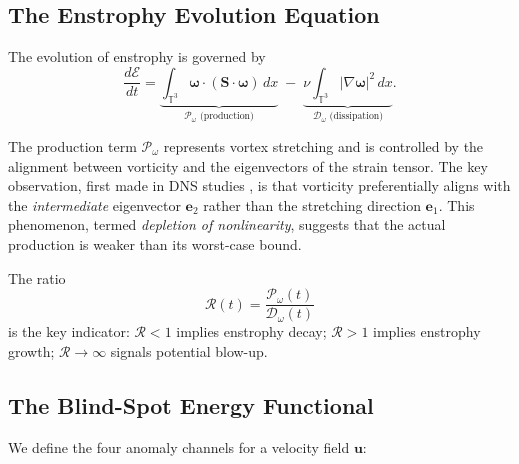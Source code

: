 \documentclass[12pt, a4paper]{article}
\newcommand{\T}{\mathbb{T}}
\newcommand{\dd}[2]{\frac{d #1}{d #2}}
\begin{document}
\subsection{The Enstrophy Evolution Equation}

The evolution of enstrophy is governed by
\begin{equation}\label{eq:enstrophy_evol}
\dd{\mathcal{E}}{t} = \underbrace{\int_{\T^3}
\boldsymbol{\omega} \cdot (\mathbf{S} \cdot \boldsymbol{\omega}) \, dx}_{\displaystyle\mathcal{P}_\omega \text{ (production)}}
\;-\; \underbrace{\nu \int_{\T^3}
|\nabla\boldsymbol{\omega}|^2 \, dx}_{\displaystyle\mathcal{D}_\omega \text{ (dissipation)}}.
\end{equation}

The production term $\mathcal{P}_\omega$ represents vortex stretching
and is controlled by the alignment between vorticity and the eigenvectors
of the strain tensor. The key observation, first made in DNS studies
\cite{ashurst1987,tsinober1992}, is that vorticity preferentially
aligns with the \emph{intermediate} eigenvector $\mathbf{e}_2$ rather
than the stretching direction $\mathbf{e}_1$. This phenomenon,
termed \emph{depletion of nonlinearity}, suggests that the actual
production is weaker than its worst-case bound.

The ratio
\begin{equation}\label{eq:PD_ratio}
\mathcal{R}(t) = \frac{\mathcal{P}_\omega(t)}{\mathcal{D}_\omega(t)}
\end{equation}
is the key indicator:
$\mathcal{R} < 1$ implies enstrophy decay;
$\mathcal{R} > 1$ implies enstrophy growth;
$\mathcal{R} \to \infty$ signals potential blow-up.

\subsection{The Blind-Spot Energy Functional}\label{subsec:Ebs}

We define the four anomaly channels for a velocity field $\mathbf{u}$:
\end{document}
